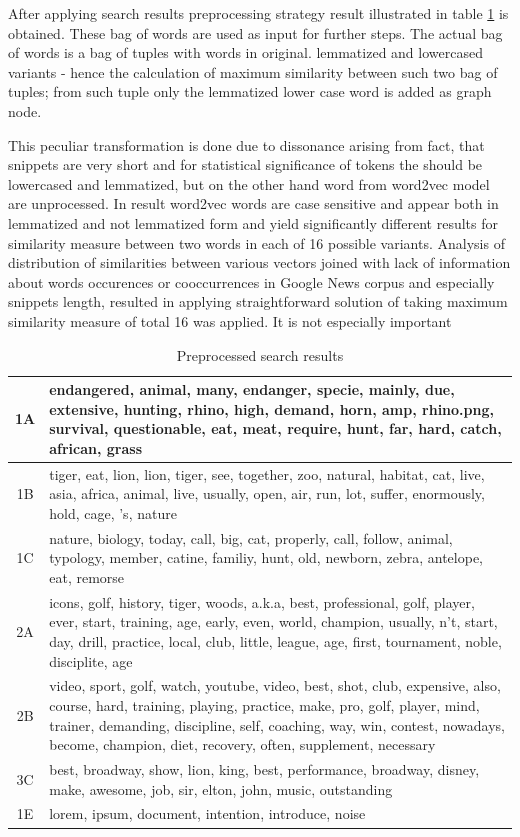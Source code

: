 \documentclass[a4paper, 12pt, oneside]{Thesis} %
\begin{document}
After applying search results preprocessing strategy result illustrated in table \ref{tab:processedsearchresults} is obtained. These bag of words are used as input for further steps. The actual bag of words is a bag of tuples with words in original. lemmatized and lowercased variants - hence the calculation of maximum similarity between such two bag of tuples; from such tuple only the lemmatized lower case word is added as graph node.

This peculiar transformation is done due to dissonance arising from fact, that snippets are very short and for statistical significance of tokens the should be lowercased and lemmatized, but on the other hand word from word2vec model are unprocessed. In result word2vec words are case sensitive and appear both in lemmatized and not lemmatized form and yield significantly different results for similarity measure between two words in each of 16 possible variants. Analysis of distribution of similarities between various vectors joined with lack of information about words occurences or cooccurrences in Google News corpus and especially snippets length, resulted in applying straightforward solution of taking maximum similarity measure of total 16 was applied. It is not especially important 

\begin{table}[th]
\centering
 \begin{tabular}{| c | p{13cm} |}
 \hline
 1A &  endangered, animal, many, endanger, specie, mainly, due, extensive, hunting, rhino, high, demand, horn, amp, rhino.png, survival, questionable, eat, meat, require, hunt, far, hard, catch, african, grass \\ \hline
 1B &  tiger, eat, lion, lion, tiger, see, together, zoo, natural, habitat, cat, live, asia, africa, animal, live, usually, open, air, run, lot, suffer, enormously, hold, cage, 's, nature \\ \hline
 1C &  nature, biology, today, call, big, cat, properly, call, follow, animal, typology, member, catine, familiy, hunt, old, newborn, zebra, antelope, eat, remorse \\ \hline
 2A &  icons, golf, history, tiger, woods, a.k.a, best, professional, golf, player, ever, start, training, age, early, even, world, champion, usually, n't, start, day, drill, practice, local, club, little, league, age, first, tournament, noble, disciplite, age \\ \hline
 2B &  video, sport, golf, watch, youtube, video, best, shot, club, expensive, also, course, hard, training, playing, practice, make, pro, golf, player, mind, trainer, demanding, discipline, self, coaching, way, win, contest, nowadays, become, champion, diet, recovery, often, supplement, necessary \\ \hline
 3C &  best, broadway, show, lion, king, best, performance, broadway, disney, make, awesome, job, sir, elton, john, music, outstanding \\ \hline
1E	&	lorem, ipsum, document, intention, introduce, noise\\ \hline
 \end{tabular}
\caption{Preprocessed search results}
\label{tab:processedsearchresults}
\end{table}
\end{document}
